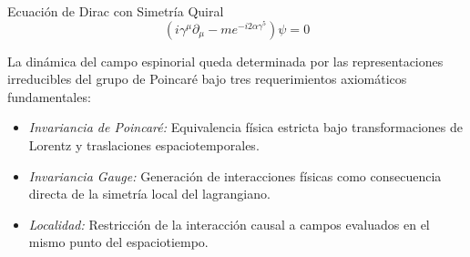 \begin{alertblock}{Ecuación de Dirac con Simetría Quiral}
  \begin{equation}\label{eq:decs}
    \left( i \gamma^\mu \partial_\mu - m e^{- i 2 \alpha \gamma^5} \right) \psi = 0
  \end{equation}

  La dinámica del campo espinorial queda determinada por las representaciones
  irreducibles del grupo de Poincaré bajo tres requerimientos axiomáticos
  fundamentales:
  \begin{itemize}
    \item \emph{Invariancia de Poincaré:} Equivalencia física estricta bajo
      transformaciones de Lorentz y traslaciones espaciotemporales.
    \item \emph{Invariancia Gauge:} Generación de interacciones físicas como
      consecuencia directa de la simetría local del lagrangiano.
    \item \emph{Localidad:} Restricción de la interacción causal a campos
      evaluados en el mismo punto del espaciotiempo.
  \end{itemize}
\end{alertblock}
